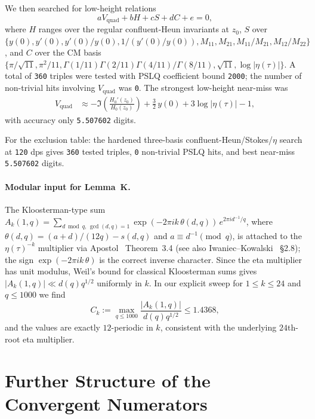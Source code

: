 \documentclass[11pt,a4paper]{article}
\theoremstyle{definition}
\theoremstyle{remark}
\begin{document}
We then searched for low-height relations
\[
  aV_{\mathrm{quad}} + bH + cS + dC + e = 0,
\]
where $H$ ranges over the regular confluent-Heun invariants at $z_0$, $S$ over
$\{y(0),y'(0),y'(0)/y(0),1/(y'(0)/y(0)),M_{11},M_{21},M_{11}/M_{21},M_{12}/M_{22}\}$,
and $C$ over the CM basis
$\{\pi/\sqrt{11},\pi^2/11,\Gamma(1/11)\Gamma(2/11)\Gamma(4/11)/\Gamma(8/11),\sqrt{11},\log|\eta(\tau)|\}$.
A total of \texttt{360} triples were tested with PSLQ coefficient bound
\texttt{2000}; the number of non-trivial hits involving $V_{\mathrm{quad}}$ was
\texttt{0}.  The strongest low-height near-miss was
\begin{align}
V_{\mathrm{quad}}
  &\approx -\Im\!\left(\frac{H_0'(z_0)}{H_0(z_0)}\right)
   + \frac{3}{2}\,y(0)
   + 3\log|\eta(\tau)| - 1,
\end{align}
with accuracy only \texttt{5.507602} digits.

For the exclusion table: the hardened three-basis confluent-Heun/Stokes/$\eta$
search at \texttt{120} dps gives \texttt{360} tested triples, \texttt{0}
non-trivial PSLQ hits, and best near-miss \texttt{5.507602} digits.

\paragraph{Modular input for Lemma~K.}
The Kloosterman-type sum $A_k(1,q) = \sum_{d \bmod q,\, \gcd(d,q)=1}
\exp(-2\pi i k\,\theta(d,q))\,e^{2\pi i d^{-1}/q}$,
where $\theta(d,q) = (a+d)/(12q) - s(d,q)$ and $a \equiv d^{-1} \pmod{q}$,
is attached to the $\eta(\tau)^{-k}$ multiplier via
Apostol~\cite{apostol1976} Theorem~3.4 (see also Iwaniec--Kowalski~\cite{IK2004}
\S2.8); the sign $\exp(-2\pi i k\,\theta)$ is the correct inverse character.
Since the eta multiplier has unit modulus, Weil's bound for classical
Kloosterman sums gives $|A_k(1,q)|\ll d(q)q^{1/2}$ uniformly in $k$. In our
explicit sweep for $1\le k\le 24$ and $q\le 1000$ we find
\[
  C_k:=\max_{q\le 1000} \frac{|A_k(1,q)|}{d(q)q^{1/2}} \le 1.4368,
\]
and the values are exactly $12$-periodic in $k$, consistent with the
underlying $24$th-root eta multiplier.

\section{Further Structure of the Convergent Numerators}\label{sec:structural}
\end{document}
